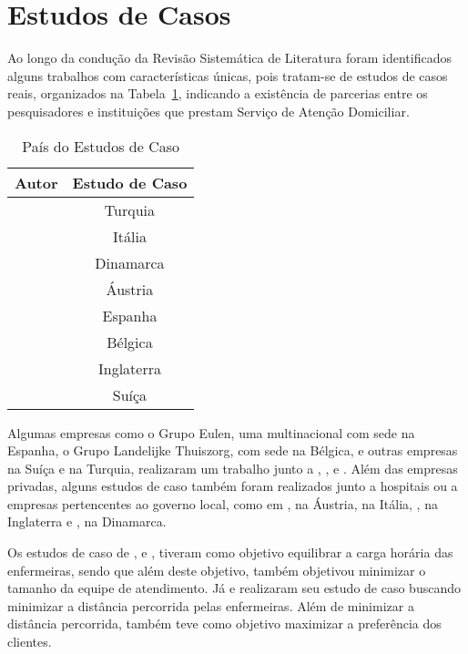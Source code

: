 \section{Estudos de Casos\label{casos}}

Ao longo da condução da Revisão Sistemática de Literatura foram identificados alguns trabalhos com características únicas, pois tratam-se de estudos de casos reais, organizados na Tabela~\ref{estudo}, indicando a existência de parcerias entre os pesquisadores e instituições que prestam Serviço de Atenção Domiciliar.

\begin{table}[H]
\centering
\caption{País do Estudos de Caso}
\label{estudo}
\begin{tabular}{c|c}
\hline
\textbf{Autor}                  & \textbf{Estudo de Caso} \\ \hline
\cite{tozlu:2016}          		& Turquia    \\ \hline
\cite{cattafi:2012}        		& Itália      \\ \hline
\cite{rasmussenm:2012}		   	& Dinamarca	   \\ \hline
\cite{trautsamwieser:2014} 		& Áustria      \\ \hline
\cite{luna:2013}           		& Espanha      \\ \hline
\cite{goos:2015}           		& Bélgica        \\ \hline
\cite{drake:2007}		 	   	& Inglaterra	  \\ \hline	
\cite{nguyen:2016}         		& Suíça         \\ \hline
\end{tabular}
\end{table}

Algumas empresas como o Grupo Eulen, uma multinacional com sede na Espanha, o Grupo Landelijke Thuiszorg, com sede na Bélgica, e outras empresas na Suíça e na Turquia, realizaram um trabalho junto a \cite{luna:2013}, \cite{goos:2015}, \cite{nguyen:2016} e \cite{tozlu:2016}. 
Além das empresas privadas, alguns estudos de caso também foram realizados junto a hospitais ou a empresas pertencentes ao governo local, como em \cite{trautsamwieser:2014}, na Áustria, \cite{cattafi:2012} na Itália, \cite{drake:2007}, na Inglaterra e \cite{rasmussenm:2012}, na Dinamarca.

Os estudos de caso de \cite{luna:2013}, \cite{trautsamwieser:2014} e \cite{cattafi:2012}, tiveram como objetivo equilibrar a carga horária das enfermeiras, sendo que além deste objetivo, \cite{luna:2013} também objetivou minimizar o tamanho da equipe de atendimento.
Já \cite{goos:2015} e \cite{tozlu:2016} realizaram seu estudo de caso buscando minimizar a distância percorrida pelas enfermeiras. Além de minimizar a distância percorrida, \cite{goos:2015} também teve como objetivo maximizar a preferência dos clientes.


